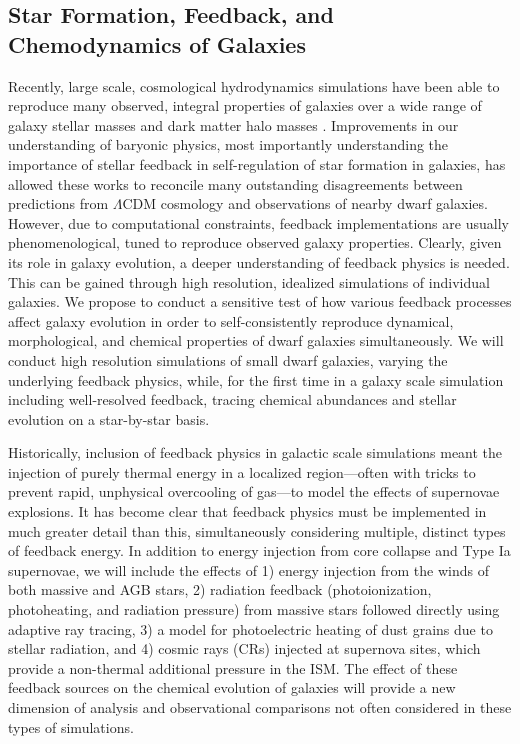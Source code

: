 \documentclass[11pt]{article}
\newcommand{\eg}{e.g.,}
\begin{document}
\subsection{Star Formation, Feedback, and Chemodynamics of Galaxies}

Recently, large scale, cosmological hydrodynamics simulations have been able to reproduce many observed, integral properties of galaxies over a wide range of galaxy stellar masses and dark matter halo masses \citep[\eg][]{MUGS2010, MAGICC2013, Illustris1, Illustris2, OWLS, EAGLE, FIRE, APOSTLE, Latte}. 
Improvements in our understanding of baryonic physics, most importantly understanding the importance of stellar feedback in self-regulation of star formation in galaxies, has allowed these works to reconcile many outstanding disagreements between predictions from $\Lambda$CDM cosmology and observations of nearby dwarf galaxies. However, due to computational constraints, feedback implementations are usually phenomenological, tuned to reproduce observed galaxy properties. Clearly, given its role in galaxy evolution, a deeper understanding of feedback physics is needed. This can be gained through high resolution, idealized simulations of individual galaxies. We propose to conduct a sensitive test of how various feedback processes affect galaxy evolution in order to self-consistently reproduce dynamical, morphological, and chemical properties of dwarf galaxies simultaneously. We will conduct high resolution simulations of small dwarf galaxies, varying the underlying feedback physics, while, for the first time in a galaxy scale simulation including well-resolved feedback, tracing chemical abundances and stellar evolution on a star-by-star basis.

Historically, inclusion of feedback physics in galactic scale simulations meant the injection of purely thermal energy in a localized region---often with tricks to prevent rapid, unphysical overcooling of gas---to model the effects of supernovae explosions. It has become clear that feedback physics must be implemented in much greater detail than this, simultaneously considering multiple, distinct types of feedback energy. In addition to energy injection from core collapse and Type Ia supernovae, we will include the effects of 1) energy injection from the winds of both massive and AGB stars, 2) radiation feedback (photoionization, photoheating, and radiation pressure) from massive stars followed directly using adaptive ray tracing, 3) a model for photoelectric heating of dust grains due to stellar radiation, and 4) cosmic rays (CRs) injected at supernova sites, which provide a non-thermal additional pressure in the ISM. The effect of these feedback sources on the chemical evolution of galaxies will provide a new dimension of analysis and observational comparisons not often considered in these types of simulations.
\end{document}
